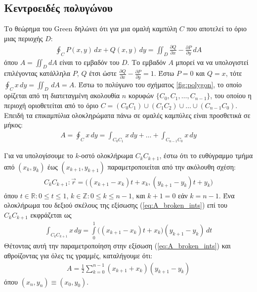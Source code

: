 \subsection{Κεντροειδές πολυγώνου}
\label{subsec:01_01_02_8}

Το θεώρημα του Green \cite{Riemann1851} δηλώνει ότι για μια ομαλή καμπύλη $C$
που αποτελεί το όριο μιας περιοχής $D$:
\begin{align}
  \oint_C P(x,y) \,dx + Q(x,y) \,dy = \iint_D \frac{\partial Q}{\partial x} - \frac{\partial P}{\partial y} \,dA
  \label{eq:green}
\end{align}
όπου $A = \iint_D dA$ είναι το εμβαδόν του $D$. Το εμβαδόν $A$ μπορεί να να
υπολογιστεί επιλέγοντας κατάλληλα $P$, $Q$ έτσι ώστε
$\frac{\partial Q}{\partial x} - \frac{\partial P}{\partial y} = 1$. Έστω
$P=0$ και $Q=x$, τότε $\oint_C x \,dy = \iint_D \,dA = A$. Έστω το πολύγωνο του
σχήματος \ref{fig:polygon}, το οποίο ορίζεται από τη διατεταγμένη ακολουθία
$n$ κορυφών $\{C_0, C_1, \dots, C_{n-1}\}$, του οποίου η περιοχή οριοθετείται
από το όριο $C = (C_0 C_1) \cup (C_1 C_2) \cup \dots \cup (C_{n-1} C_0)$.
Επειδή τα επικαμπύλια ολοκληρώματα πάνω σε ομαλές καμπύλες είναι προσθετικά σε
μήκος:
\begin{align}
  A = \oint_C x \,dy = \int_{C_0 C_1} x \,dy + \dots + \int_{C_{n-1} C_0} x \,dy
  \label{eq:A_broken_ints}
\end{align}

Για να υπολογίσουμε το $k$-οστό ολοκλήρωμα $C_k C_{k+1}$, έστω ότι το
ευθύγραμμο τμήμα από $(x_k,y_k)$ έως $(x_{k+1}, y_{k+1})$ παραμετροποιείται από
την ακόλουθη σχέση:
\begin{align}
  C_k C_{k+1} : \vec{r} = \big( (x_{k+1}-x_k)t + x_k, (y_{k+1}-y_k)t + y_k \big)
\end{align}
όπου $t \in \mathbb{R}: 0 \leq t\leq 1$, $k \in \mathbb{Z}: 0 \leq k \leq n-1$,
και $k+1 = 0$ εάν $k=n-1$. Ένα ολοκλήρωμα του δεξιού σκέλους της εξίσωσης
(\ref{eq:A_broken_ints}) επί του $C_k C_{k+1}$ εκφράζεται ως
\begin{align}
  \int_{C_k C_{k+1}} x \,dy = \int\limits_0^1 \big( (x_{k+1}-x_k)t + x_k \big) (y_{k+1}-y_k) \,dt
  \label{eq:A_one_int}
\end{align}
Θέτοντας αυτή την παραμετροποίηση στην εξίσωση (\ref{eq:A_broken_ints}) και
αθροίζοντας για όλες τις γραμμές, καταλήγουμε ότι:
\begin{align}
  A = \frac{1}{2}\sum\limits_{k=0}^{n-1} (x_{k+1} + x_k) (y_{k+1} - y_k)
\label{eq:polygon_area}
\end{align}
όπου $(x_n,y_n) \equiv (x_0, y_0)$.

